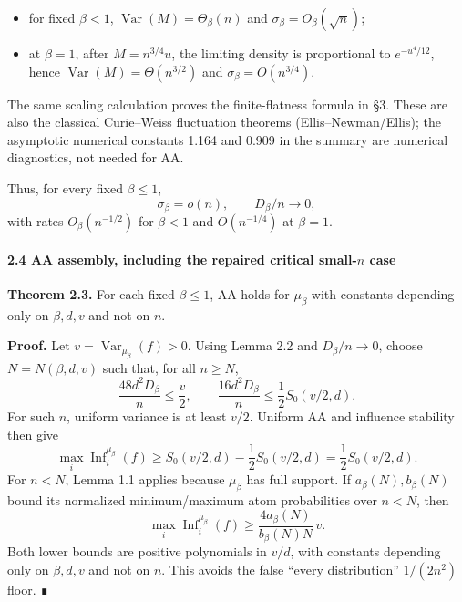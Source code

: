 \begin{itemize}
\tightlist
\item
  for fixed \(\beta<1\), \(\operatorname{Var}(M)=\Theta_\beta(n)\) and \(\sigma_\beta=O_\beta(\sqrt n)\);
\item
  at \(\beta=1\), after \(M=n^{3/4}u\), the limiting density is proportional to \(e^{-u^4/12}\), hence \(\operatorname{Var}(M)=\Theta(n^{3/2})\) and \(\sigma_\beta=O(n^{3/4})\).
\end{itemize}

The same scaling calculation proves the finite-flatness formula in §3. These are also the classical Curie--Weiss fluctuation theorems (Ellis--Newman/Ellis); the asymptotic numerical constants 1.164 and 0.909 in the summary are numerical diagnostics, not needed for AA.

Thus, for every fixed \(\beta\le1\),
\[\sigma_\beta=o(n),\qquad D_\beta/n\to0,\]
with rates \(O_{\beta}(n^{-1/2})\) for \(\beta<1\) and \(O(n^{-1/4})\) at \(\beta=1\).

\paragraph{\texorpdfstring{2.4 AA assembly, including the repaired critical small-\(n\) case}{2.4 AA assembly, including the repaired critical small-n case}}\label{aa-assembly-including-the-repaired-critical-small-n-case}

\textbf{Theorem 2.3.} For each fixed \(\beta\le1\), AA holds for \(\mu_\beta\) with constants depending only on \(\beta,d,v\) and not on \(n\).

\textbf{Proof.} Let \(v=\operatorname{Var}_{\mu_\beta}(f)>0\). Using Lemma 2.2 and \(D_\beta/n\to0\), choose \(N=N(\beta,d,v)\) such that, for all \(n\ge N\),
\[\frac{48d^2D_\beta}{n}\le\frac v2,
\qquad
\frac{16d^2D_\beta}{n}\le\frac12S_0(v/2,d).\]
For such \(n\), uniform variance is at least \(v/2\). Uniform AA and influence stability then give
\[\max_i\operatorname{Inf}_i^{\mu_\beta}(f)
\ge S_0(v/2,d)-\frac12S_0(v/2,d)
=\frac12S_0(v/2,d).\]
For \(n<N\), Lemma 1.1 applies because \(\mu_\beta\) has full support. If \(a_\beta(N),b_\beta(N)\) bound its normalized minimum/maximum atom probabilities over \(n<N\), then
\[\max_i\operatorname{Inf}_i^{\mu_\beta}(f)
\ge \frac{4a_\beta(N)}{b_\beta(N)N}\,v.\]
Both lower bounds are positive polynomials in \(v/d\), with constants depending only on \(\beta,d,v\) and not on \(n\). This avoids the false ``every distribution'' \(1/(2n^2)\) floor. ∎


